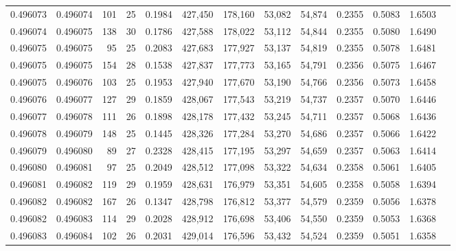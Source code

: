 \begin{tabular}{rrrrrrrrrrrrr}
0.496073 & 0.496074 & 101 &  25 &                                     0.1984 & 427,450 & 178,160 &  53,082 &  54,874 & 0.2355 & 0.5083 & 1.6503 \\
0.496074 & 0.496075 & 138 &  30 &                                     0.1786 & 427,588 & 178,022 &  53,112 &  54,844 & 0.2355 & 0.5080 & 1.6490 \\
0.496075 & 0.496075 &  95 &  25 &                                     0.2083 & 427,683 & 177,927 &  53,137 &  54,819 & 0.2355 & 0.5078 & 1.6481 \\
0.496075 & 0.496075 & 154 &  28 &                                     0.1538 & 427,837 & 177,773 &  53,165 &  54,791 & 0.2356 & 0.5075 & 1.6467 \\
0.496075 & 0.496076 & 103 &  25 &                                     0.1953 & 427,940 & 177,670 &  53,190 &  54,766 & 0.2356 & 0.5073 & 1.6458 \\
0.496076 & 0.496077 & 127 &  29 &                                     0.1859 & 428,067 & 177,543 &  53,219 &  54,737 & 0.2357 & 0.5070 & 1.6446 \\
0.496077 & 0.496078 & 111 &  26 &                                     0.1898 & 428,178 & 177,432 &  53,245 &  54,711 & 0.2357 & 0.5068 & 1.6436 \\
0.496078 & 0.496079 & 148 &  25 &                                     0.1445 & 428,326 & 177,284 &  53,270 &  54,686 & 0.2357 & 0.5066 & 1.6422 \\
0.496079 & 0.496080 &  89 &  27 &                                     0.2328 & 428,415 & 177,195 &  53,297 &  54,659 & 0.2357 & 0.5063 & 1.6414 \\
0.496080 & 0.496081 &  97 &  25 &                                     0.2049 & 428,512 & 177,098 &  53,322 &  54,634 & 0.2358 & 0.5061 & 1.6405 \\
0.496081 & 0.496082 & 119 &  29 &                                     0.1959 & 428,631 & 176,979 &  53,351 &  54,605 & 0.2358 & 0.5058 & 1.6394 \\
0.496082 & 0.496082 & 167 &  26 &                                     0.1347 & 428,798 & 176,812 &  53,377 &  54,579 & 0.2359 & 0.5056 & 1.6378 \\
0.496082 & 0.496083 & 114 &  29 &                                     0.2028 & 428,912 & 176,698 &  53,406 &  54,550 & 0.2359 & 0.5053 & 1.6368 \\
0.496083 & 0.496084 & 102 &  26 &                                     0.2031 & 429,014 & 176,596 &  53,432 &  54,524 & 0.2359 & 0.5051 & 1.6358 \\

\end{tabular}
